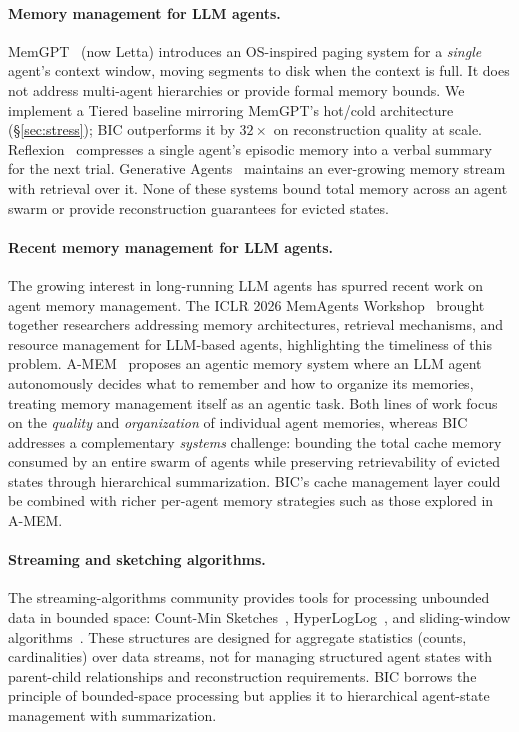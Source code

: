 \paragraph{Memory management for LLM agents.}
MemGPT~\citep{packer2023memgpt} (now Letta) introduces an
OS-inspired paging system for a \emph{single} agent's context window,
moving segments to disk when the context is full.  It does not address
multi-agent hierarchies or provide formal memory bounds.  We
implement a Tiered baseline mirroring MemGPT's hot/cold architecture
(\S\ref{sec:stress}); BIC outperforms it by $32\times$ on
reconstruction quality at scale.
Reflexion~\citep{shinn2023reflexion} compresses a single agent's
episodic memory into a verbal summary for the next trial.
Generative Agents~\citep{park2023generative} maintains an
ever-growing memory stream with retrieval over it.
None of these systems bound total memory across an agent swarm or
provide reconstruction guarantees for evicted states.

\paragraph{Recent memory management for LLM agents.}
The growing interest in long-running LLM agents has spurred recent work
on agent memory management.  The ICLR 2026 MemAgents
Workshop~\citep{memagents2026} brought together researchers addressing
memory architectures, retrieval mechanisms, and resource management for
LLM-based agents, highlighting the timeliness of this problem.
A-MEM~\citep{amem2025} proposes an agentic memory system where an LLM
agent autonomously decides what to remember and how to organize its
memories, treating memory management itself as an agentic task.
Both lines of work focus on the \emph{quality} and \emph{organization}
of individual agent memories, whereas BIC addresses a complementary
\emph{systems} challenge: bounding the total cache memory consumed by
an entire swarm of agents while preserving retrievability of evicted
states through hierarchical summarization.  BIC's cache management
layer could be combined with richer per-agent memory strategies such
as those explored in A-MEM.

\paragraph{Streaming and sketching algorithms.}
The streaming-algorithms community provides tools for processing
unbounded data in bounded space: Count-Min
Sketches~\citep{cormode2005cm}, HyperLogLog~\citep{flajolet2007hyperloglog},
and sliding-window algorithms~\citep{datar2002sliding}.  These
structures are designed for aggregate statistics (counts, cardinalities)
over data streams, not for managing structured agent states with
parent-child relationships and reconstruction requirements.  BIC
borrows the principle of bounded-space processing but applies it to
hierarchical agent-state management with summarization.

